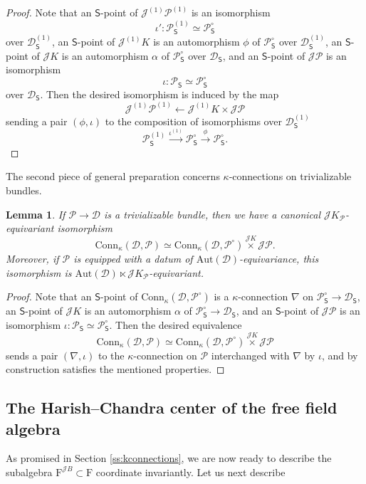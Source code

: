 \documentclass{amsart}
\newtheorem{Lem}[Thm]{Lemma}
\theoremstyle{definition}
\newcommand{\diglet}{\mathrm{F}}
\newcommand{\fr}{^\on{(1)}}
\newcommand{\sD}{\mathscr{D}}
\newcommand{\Sing}{\mathsf{S}}
\newcommand{\on}{\mathrm}
\newcommand{\sP}{\mathscr{P}}
\newcommand{\Jet}{\mathscr{J}}
\newcommand{\Conn}{\on{Conn}}
\newcommand{\Aut}{\on{Aut}}
\numberwithin{equation}{section}
\begin{document}
\begin{proof} Note that an $\Sing$-point of $\Jet\fr \sP\fr$ is an isomorphism $$\iota': \sP\fr_\Sing \simeq \sP^\circ_\Sing$$over $\sD_\Sing\fr$, an $\Sing$-point of $\Jet\fr K$ is an automorphism $\phi$ of $\sP^\circ_\Sing$ over $\sD\fr_\Sing$, an $\Sing$-point of $\Jet K$ is an automorphism $\alpha$ of $\sP^\circ_\Sing$ over $\sD_\Sing$, and an $\Sing$-point of $\Jet \sP$ is an isomorphism $$\iota: \sP_\Sing \simeq \sP^\circ_\Sing$$over $\sD_\Sing$. Then the desired isomorphism is induced by the map 
$$\Jet \fr \sP\fr \leftarrow \Jet\fr K \times \Jet \sP$$sending a pair $(\phi, \iota)$ to the composition of isomorphisms over $\sD\fr_\Sing$
$$\sP\fr_\Sing \xrightarrow{\iota\fr}  \sP^\circ_\Sing \xrightarrow{\phi}\sP^\circ_\Sing.$$
\end{proof}


The second piece of general preparation concerns $\kappa$-connections on trivializable bundles. 
\begin{Lem} \label{l:connectandjet}If $\sP \rightarrow \sD$ is a trivializable bundle, then we have a canonical $\Jet K_\sP$-equivariant isomorphism
$$\Conn_\kappa(\sD, \sP) \simeq \Conn_\kappa(\sD, \sP^\circ) \overset{ \Jet K} \times \Jet \sP.$$
Moreover, if $\sP$ is equipped with a datum of $\Aut(\sD)$-equivariance, this isomorphism is $\Aut(\sD) \ltimes \Jet K_\sP$-equivariant. 
\end{Lem}

\begin{proof} Note that an $\Sing$-point of $\Conn_\kappa(\sD, \sP^\circ)$ is a $\kappa$-connection $\nabla$ on $\sP^\circ_\Sing \rightarrow \sD_\Sing$, an $\Sing$-point of $\Jet K$ is an automorphism $\alpha$ of $\sP^\circ_\Sing \rightarrow \sD_\Sing$, and an $\Sing$-point of $\Jet \sP$ is an isomorphism $\iota: \sP_\Sing \simeq \sP^\circ_\Sing$. Then the desired equivalence $$\Conn_\kappa(\sD, \sP) \simeq \Conn_\kappa(\sD, \sP^\circ) \overset{ \Jet K} \times \Jet \sP$$ 
sends a pair $(\nabla, \iota)$ to the $\kappa$-connection on $\sP$ interchanged with $\nabla$ by $\iota$, and by construction satisfies the mentioned properties.
\end{proof}



\subsection{The Harish--Chandra center of the free field algebra} 

\label{ss_hcff}
 As promised in Section \ref{ss:kconnections}, we are now ready to describe the subalgebra  $\diglet^{\Jet B} \subset \diglet$ coordinate invariantly. \iffalse  Let us next describe 
\end{document}
